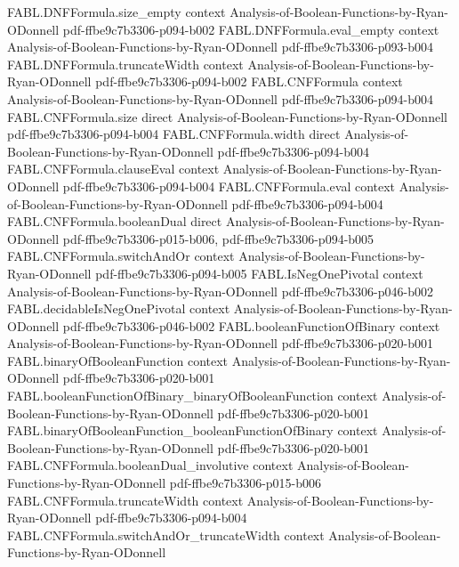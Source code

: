 \begin{theorem}
  {FABL.DNFFormula.size_empty}
  {context}
  {Analysis-of-Boolean-Functions-by-Ryan-ODonnell}
  {pdf-ffbe9c7b3306-p094-b002}
\proofstep
  {FABL.DNFFormula.eval_empty}
  {context}
  {Analysis-of-Boolean-Functions-by-Ryan-ODonnell}
  {pdf-ffbe9c7b3306-p093-b004}
\proofstep
  {FABL.DNFFormula.truncateWidth}
  {context}
  {Analysis-of-Boolean-Functions-by-Ryan-ODonnell}
  {pdf-ffbe9c7b3306-p094-b002}
\proofstep
  {FABL.CNFFormula}
  {context}
  {Analysis-of-Boolean-Functions-by-Ryan-ODonnell}
  {pdf-ffbe9c7b3306-p094-b004}
\proofstep
  {FABL.CNFFormula.size}
  {direct}
  {Analysis-of-Boolean-Functions-by-Ryan-ODonnell}
  {pdf-ffbe9c7b3306-p094-b004}
\proofstep
  {FABL.CNFFormula.width}
  {direct}
  {Analysis-of-Boolean-Functions-by-Ryan-ODonnell}
  {pdf-ffbe9c7b3306-p094-b004}
\proofstep
  {FABL.CNFFormula.clauseEval}
  {context}
  {Analysis-of-Boolean-Functions-by-Ryan-ODonnell}
  {pdf-ffbe9c7b3306-p094-b004}
\proofstep
  {FABL.CNFFormula.eval}
  {context}
  {Analysis-of-Boolean-Functions-by-Ryan-ODonnell}
  {pdf-ffbe9c7b3306-p094-b004}
\proofstep
  {FABL.CNFFormula.booleanDual}
  {direct}
  {Analysis-of-Boolean-Functions-by-Ryan-ODonnell}
  {pdf-ffbe9c7b3306-p015-b006,
    pdf-ffbe9c7b3306-p094-b005}
\proofstep
  {FABL.CNFFormula.switchAndOr}
  {context}
  {Analysis-of-Boolean-Functions-by-Ryan-ODonnell}
  {pdf-ffbe9c7b3306-p094-b005}
\proofstep
  {FABL.IsNegOnePivotal}
  {context}
  {Analysis-of-Boolean-Functions-by-Ryan-ODonnell}
  {pdf-ffbe9c7b3306-p046-b002}
\proofstep
  {FABL.decidableIsNegOnePivotal}
  {context}
  {Analysis-of-Boolean-Functions-by-Ryan-ODonnell}
  {pdf-ffbe9c7b3306-p046-b002}
\proofstep
  {FABL.booleanFunctionOfBinary}
  {context}
  {Analysis-of-Boolean-Functions-by-Ryan-ODonnell}
  {pdf-ffbe9c7b3306-p020-b001}
\proofstep
  {FABL.binaryOfBooleanFunction}
  {context}
  {Analysis-of-Boolean-Functions-by-Ryan-ODonnell}
  {pdf-ffbe9c7b3306-p020-b001}
\proofstep
  {FABL.booleanFunctionOfBinary_binaryOfBooleanFunction}
  {context}
  {Analysis-of-Boolean-Functions-by-Ryan-ODonnell}
  {pdf-ffbe9c7b3306-p020-b001}
\proofstep
  {FABL.binaryOfBooleanFunction_booleanFunctionOfBinary}
  {context}
  {Analysis-of-Boolean-Functions-by-Ryan-ODonnell}
  {pdf-ffbe9c7b3306-p020-b001}
\proofstep
  {FABL.CNFFormula.booleanDual_involutive}
  {context}
  {Analysis-of-Boolean-Functions-by-Ryan-ODonnell}
  {pdf-ffbe9c7b3306-p015-b006}
\proofstep
  {FABL.CNFFormula.truncateWidth}
  {context}
  {Analysis-of-Boolean-Functions-by-Ryan-ODonnell}
  {pdf-ffbe9c7b3306-p094-b004}
\proofstep
  {FABL.CNFFormula.switchAndOr_truncateWidth}
  {context}
  {Analysis-of-Boolean-Functions-by-Ryan-ODonnell}

\end{theorem}
